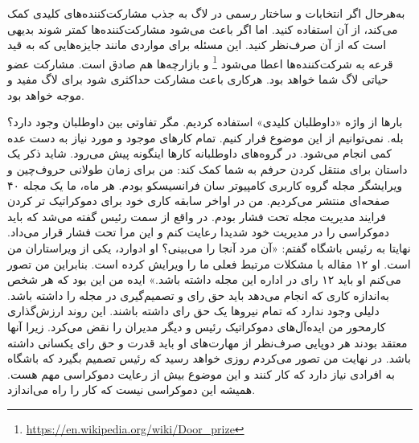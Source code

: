 به‌هرحال اگر انتخابات و ساختار رسمی در لاگ به جذب مشارکت‌کننده‌های کلیدی کمک می‌کند، از آن استفاده کنید.
اما اگر باعث می‌شود مشارکت‌کننده‌ها کمتر شوند بدیهی است  که از آن صرف‌نظر کنید. این مسئله برای مواردی
مانند جایزه‌هایی که به قید قرعه به شرکت‌کننده‌ها اعطا می‌شود
\footnote{\url{https://en.wikipedia.org/wiki/Door_prize}}
و بازارچه‌ها هم صادق است. مشارکت عضو حیاتی لاگ شما خواهد بود. هرکاری باعث مشارکت حداکثری شود
برای لاگ مفید و موجه خواهد بود.

بارها از واژه «داوطلبان کلیدی» استفاده کردیم. مگر تفاوتی بین داوطلبان وجود دارد؟ بله. نمی‌توانیم از این موضوع فرار
کنیم. تمام کارهای موجود و مورد نیاز به دست عده کمی انجام می‌شود. در گروه‌های داوطلبانه کارها اینگونه
پیش می‌رود. شاید ذکر یک داستان برای منتقل کردن حرفم به شما کمک کند:
من برای زمان طولانی حروف‌چین و ویرایشگر مجله گروه کاربری کامپیوتر سان فرانسیسکو بودم. هر ماه، ما یک مجله
۴۰ صفحه‌ای منتشر می‌کردیم. من در اواخر سابقه کاری خود برای دموکراتیک تر کردن فرایند مدیریت مجله تحت فشار بودم.
در واقع از سمت رئیس گفته می‌شد که باید دموکراسی را در مدیریت خود شدیدا رعایت کنم و این مرا تحت فشار قرار می‌داد.
نهایتا به رئیس باشگاه گفتم: «آن مرد آنجا را می‌بینی؟ او ادوارد، یکی از ویراستاران من است.
او ۱۲ مقاله با مشکلات مرتبط فعلی ما را ویرایش کرده است. بنابراین من تصور می‌کنم او باید ۱۲ رای در اداره این
مجله داشته باشد.» ایده من این بود که هر شخص به‌اندازه کاری که انجام می‌دهد باید حق رای و تصمیم‌گیری
در مجله را داشته باشد. دلیلی وجود ندارد که تمام نیروها یک حق رای داشته باشند.
این روند ارزش‌گذاری کارمحور من ایده‌آل‌های دموکراتیک رئیس و دیگر مدیران را نقض می‌کرد. زیرا آنها معتقد بودند
هر دوپایی صرف‌نظر از مهارت‌‌های او باید قدرت و حق رای یکسانی داشته باشد.
در نهایت من تصور می‌کردم روزی خواهد رسید که رئیس تصمیم بگیرد که باشگاه به افرادی نیاز دارد که کار کنند و
این موضوع بیش از رعایت دموکراسی مهم هست. همیشه این دموکراسی نیست که کار را راه می‌اندازد.

